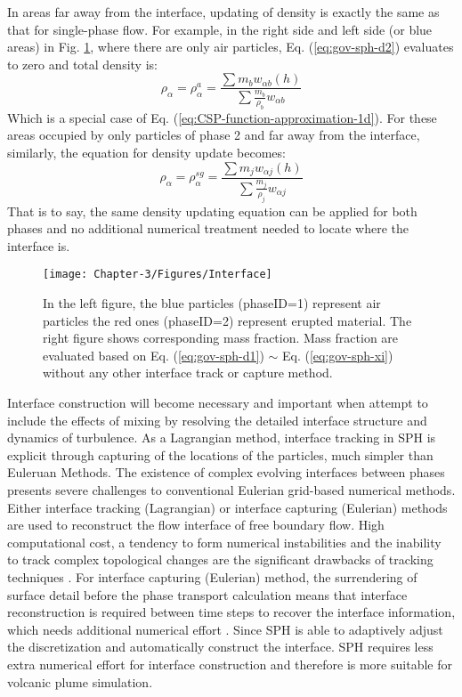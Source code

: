 In areas far away from the interface, updating of density is exactly the same as that for single-phase flow. For example, in the right side and left side (or blue areas) in Fig. \ref{fig:SPH-multiple-density}, where there are only air particles, Eq.  (\ref{eq:gov-sph-d2}) evaluates to zero and total density is:
\begin{equation}
\rho_{\alpha}=\rho_{\alpha}^a=\frac{\sum m_b w_{\alpha b} \left(h\right)}{\sum \frac{m_b}{\rho_b} w_{\alpha b}}
\end{equation}
Which is a special case of Eq. (\ref{eq:CSP-function-approximation-1d}). For these areas occupied by only particles of phase 2 and far away from the interface, similarly, the equation for density update becomes: 
\begin{equation}
\rho_{\alpha}=\rho_{\alpha}^{sg}=\frac{\sum m_j w_{\alpha j} \left(h\right)}{\sum \frac{m_j}{\rho_j} w_{\alpha j}}
\end{equation}
That is to say, the same density updating equation can be applied for both phases and no additional numerical treatment needed to locate where the interface is.

\begin{figure}
\center
\texttt{[image: Chapter-3/Figures/Interface]}
\caption{In the left figure, the blue particles (phaseID=1) represent air particles the red ones (phaseID=2) represent erupted material. The right figure shows corresponding mass fraction. Mass fraction are evaluated based on Eq. (\ref{eq:gov-sph-d1}) $\sim$ Eq. (\ref{eq:gov-sph-xi}) without any other interface track or capture method.}
\label{fig:SPH-multiple-density}
\end{figure}

Interface construction will become necessary and important when attempt to include the effects of mixing by resolving the detailed interface structure and dynamics of turbulence. 
As a Lagrangian method, interface tracking in SPH is explicit through capturing of the locations of the particles, much simpler than Euleruan Methods.
The existence of complex evolving interfaces between phases presents severe challenges to conventional Eulerian grid-based numerical methods. Either interface tracking (Lagrangian) \citep{harlow1965numerical, wrobel1991computational, cheng1995simplified} or interface capturing (Eulerian) \citep{hirt1981volume, youngs1982time, gerlach2006comparison, gopala2008volume} methods are used to reconstruct the flow interface of free boundary flow. High computational cost, a tendency to form numerical instabilities and the inability to track complex topological changes are the significant drawbacks of tracking techniques \citep{hirt1981volume, unverdi1992front, anderson1998diffuse}. For interface capturing (Eulerian) method, the surrendering of surface detail before the phase transport calculation means that interface reconstruction is required between time steps to recover the interface information, which needs additional numerical effort \citep{hirt1981volume, youngs1982time}.
Since SPH is able to adaptively adjust the discretization and automatically construct the interface. SPH requires less extra numerical effort for interface construction and therefore is more suitable for volcanic plume simulation.
 
